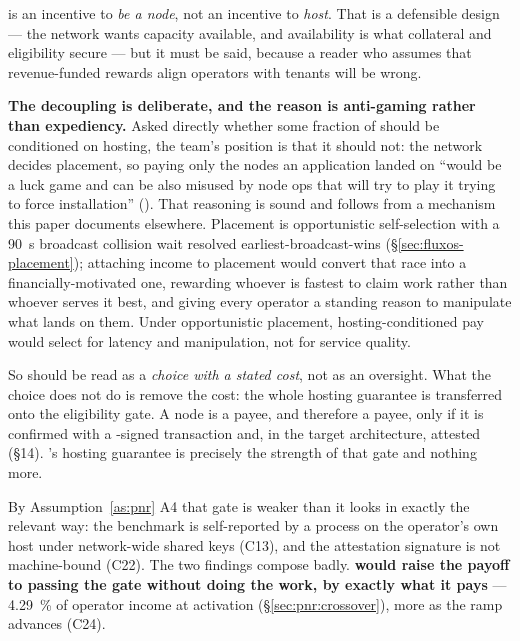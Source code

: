 \begin{remark}
\label{rem:pnr:framing}
\PNR is an incentive to \emph{be a node}, not an incentive to \emph{host}. That is a defensible
design --- the network wants capacity available, and availability is what collateral and eligibility
secure --- but it must be said, because a reader who assumes that revenue-funded rewards align
operators with tenants will be wrong.

\textbf{The decoupling is deliberate, and the reason is anti-gaming rather than expediency.} Asked
directly whether some fraction of \PNR should be conditioned on hosting, the team's position is that
it should not: the network decides placement, so paying only the nodes an application landed on
``would be a luck game and can be also misused by node ops that will try to play it trying to force
installation''  (\planned). That reasoning is sound and
follows from a mechanism this paper documents elsewhere. Placement is opportunistic self-selection
with a \SI{90}{\second} broadcast collision wait resolved earliest-broadcast-wins
(\S\ref{sec:fluxos-placement}); attaching income to placement would convert that race into a
financially-motivated one, rewarding whoever is fastest to claim work rather than whoever serves it
best, and giving every operator a standing reason to manipulate what lands on them. Under
opportunistic placement, hosting-conditioned pay would select for latency and manipulation, not for
service quality.

So  should be read as a \emph{choice with a stated cost}, not as an
oversight. What the choice does not do is remove the cost: the whole hosting guarantee is transferred
onto the eligibility gate. A node is a \PoN payee, and therefore a \PNR payee, only if it is confirmed
with a \fluxbench-signed transaction and, in the target architecture, attested (\S14). \PNR's hosting
guarantee is precisely the strength of that gate and nothing more.

By Assumption~\ref{as:pnr} A4 that gate is weaker than it looks in exactly the relevant way: the
benchmark is self-reported by a process on the operator's own host under network-wide shared keys
(C13), and the attestation signature is not machine-bound (C22). The two findings compose badly.
\textbf{\PNR would raise the payoff to passing the gate without doing the work, by exactly what it
pays} --- \SI{4.29}{\percent} of operator income at activation (\S\ref{sec:pnr:crossover}), more as
the ramp advances (C24).


\end{remark}
